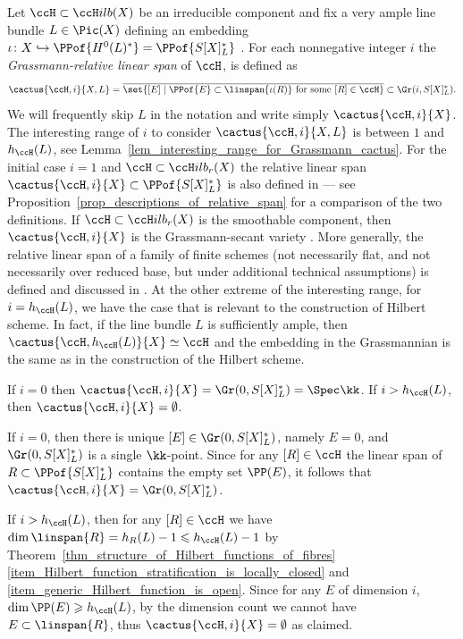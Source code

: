 \documentclass[12pt,a4paper]{article}
\newcommand{\usualHilb}{{\ccH}ilb}
\begin{document}
Let $\ccH\subset \usualHilb(X)$ be an irreducible component and fix a very ample line bundle $L\in \Pic(X)$ defining an embedding $\iota\colon X\hookrightarrow \PPof{H^0(L)^*} = \PPof{S[X]_L^*}$ .
For each nonnegative integer $i$
the \emph{Grassmann-relative linear span} of   $\ccH$,
  is defined as
  \[
     \cactus{\ccH,i}{X, L} =
     \overline{\set{
      [E]\mid \PPof{E}\subset \linspan{\iota(R)} \text{ for some } [R]\in \ccH
     }} \subset \Gr(i, S[X]_L^*).
  \]
We will frequently skip $L$ in the notation and write simply $\cactus{\ccH,i}{X}$.
The interesting range of $i$ to consider $\cactus{\ccH,i}{X, L}$ is between $1$ and $h_{\ccH}(L)$,
see Lemma~\ref{lem_interesting_range_for_Grassmann_cactus}.
For the initial case $i=1$ and $\ccH\subset \usualHilb_r(X)$
the relative linear span $\cactus{\ccH,i}{X} \subset \PPof{S[X]_L^*}$
is also defined in \cite[Def.~5.23]{jabu_jelisiejew_finite_schemes_and_secants}
--- see Proposition~\ref{prop_descriptions_of_relative_span} for a comparison of the two definitions.
If $\ccH \subset \usualHilb_r(X)$ is the smoothable component,
  then $\cactus{\ccH,i}{X}$ is the Grassmann-secant variety \cite[Def.~1.1]{landsberg_jabu_ranks_of_tensors}.
More generally, the relative linear span
  of a family of finite schemes (not necessarily flat, and not necessarily over reduced base, but under additional technical assumptions) is defined and discussed in \cite[\S3.2]{jabu_keneshlou_cactus_scheme}.
At the other extreme of the interesting range, for $i=h_{\ccH}(L)$, we have the case that is relevant to the construction of Hilbert scheme.
In fact, if the line bundle $L$ is sufficiently ample, then $\cactus{\ccH,h_{\ccH}(L)}{X} \simeq \ccH$ and the embedding in the Grassmannian is the same as in the construction of the Hilbert scheme.


\begin{lemma}
   \label{lem_interesting_range_for_Grassmann_cactus}
   If $i=0$ then $\cactus{\ccH,i}{X} = \Gr(0, S[X]_L^*) = \Spec \kk$.
   If $i > h_{\ccH}(L)$, then
   $\cactus{\ccH,i}{X} = \emptyset$.
\end{lemma}
\begin{prf}
  If $i=0$, then there is unique $[E]\in \Gr(0, S[X]_L^*)$, namely $E=0$, and $\Gr(0, S[X]_L^*)$ is a single $\kk$-point.
  Since for any $[R] \in \ccH$ the linear span of $R \subset \PPof{S[X]_L^*}$ contains the empty set $\PP(E)$, it follows that $\cactus{\ccH,i}{X} = \Gr(0, S[X]_L^*)$.

  If $i>  h_{\ccH}(L)$, then
    for any $[R]\in \ccH$
    we have $\dim\linspan{R}= h_R(L) -1 \leqslant h_{\ccH}(L)-1$ by Theorem~\ref{thm_structure_of_Hilbert_functions_of_fibres}\ref{item_Hilbert_function_stratification_is_locally_closed} and \ref{item_generic_Hilbert_function_is_open}.
   Since for any $E$ of dimension $i$, $\dim \PP(E)\geqslant h_{\ccH}(L)$, by the dimension count we cannot have $E \subset \linspan{R}$, thus    $\cactus{\ccH,i}{X} = \emptyset$ as claimed.
\end{prf}
\end{document}

